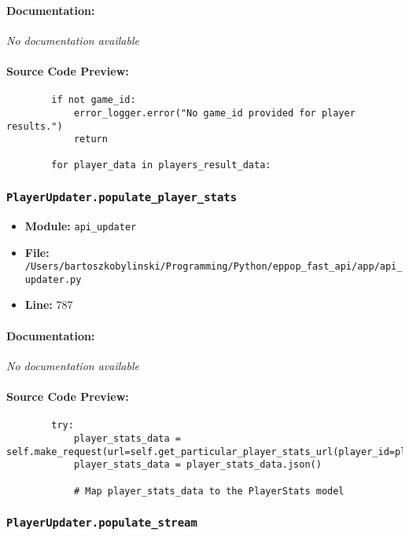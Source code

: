 \documentclass[11pt,a4paper]{article}
\begin{document}
\paragraph{Documentation:} \textit{No documentation available}

\paragraph{Source Code Preview:}
\begin{verbatim}
        if not game_id:
            error_logger.error("No game_id provided for player results.")
            return

        for player_data in players_result_data:
\end{verbatim}

\vspace{1em}
\subsubsection{\texttt{PlayerUpdater.populate\_player\_stats}}

\begin{itemize}
    \item \textbf{Module:} \texttt{api\_updater}
    \item \textbf{File:} \texttt{/Users/bartoszkobylinski/Programming/Python/eppop\_fast\_api/app/api\_updater.py}
    \item \textbf{Line:} 787
\end{itemize}

\paragraph{Documentation:} \textit{No documentation available}

\paragraph{Source Code Preview:}
\begin{verbatim}
        try:
            player_stats_data = self.make_request(url=self.get_particular_player_stats_url(player_id=player_id))
            player_stats_data = player_stats_data.json()

            # Map player_stats_data to the PlayerStats model
\end{verbatim}

\vspace{1em}
\subsubsection{\texttt{PlayerUpdater.populate\_stream}}
\end{document}
